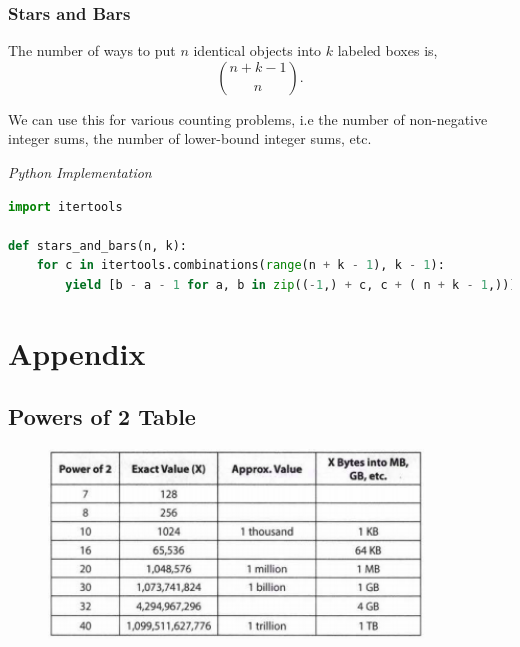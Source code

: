 \documentclass{article}
\begin{document}
    \subsubsection{Stars and Bars}

    The number of ways to put $n$ identical objects into $k$ labeled boxes is,
    \[
    \binom{n+k-1}{n}.
    \]
    
    We can use this for various counting problems, i.e the number of non-negative integer sums, the number of lower-bound integer sums, etc.
    
\vspace{8pt} \emph{Python Implementation}
\begin{lstlisting}[language=Python]
import itertools

def stars_and_bars(n, k):
    for c in itertools.combinations(range(n + k - 1), k - 1):
        yield [b - a - 1 for a, b in zip((-1,) + c, c + ( n + k - 1,))]
\end{lstlisting}

\newpage
\section{Appendix}

\subsection{Powers of 2 Table}

\begin{figure}[h]
    \centering
    \includegraphics[width=10cm]{powers-of-two.png}
\end{figure}
\end{document}

